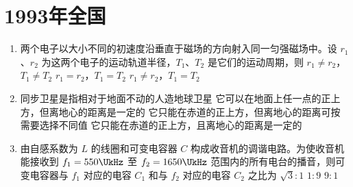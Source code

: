 \documentclass[\gkver]{gaokaozhenti}
\begin{document}
\chapter{1993年全国}

\begin{enumerate}
\item
两个电子以大小不同的初速度沿垂直于磁场的方向射入同一匀强磁场中。设 $r_{1}$、$r_{2}$ 为这两个电子的运动轨道半径，$T_{1}$、$T_{2}$ 是它们的运动周期，则
{$r_{1}\neq r_{2}$，$T_{1}\neq T_{2}$}
{$r_{1}=r_{2}$，$T_{1}=T_{2}$}
{$r_{1}\neq r_{2}$，$T_{1}=T_{2}$}


\item
同步卫星是指相对于地面不动的人造地球卫星
{它可以在地面上任一点的正上方，但离地心的距离是一定的}
{它只能在赤道的正上方，但离地心的距离可按需要选择不同值}
{它只能在赤道的正上方，且离地心的距离是一定的}


\item
由自感系数为 $L$ 的线圈和可变电容器 $C$ 构成收音机的调谐电路。为使收音机能接收到 $f_{1}=550\UkHz$ 至 $f_{2}=1650\UkHz$ 范围内的所有电台的播音，则可变电容器与 $f_{1}$ 对应的电容 $C_{1}$ 和与 $f_{2}$ 对应的电容 $C_{2}$ 之比为
{$\sqrt{3}:1$}
{$1:9$}
{$9:1$}


\end{enumerate}
\end{document}
